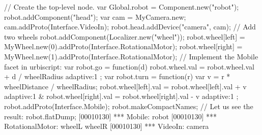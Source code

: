 \begin{urbiunchecked}
// Create the top-level node.
var Global.robot = Component.new("robot");
robot.addComponent("head");
var cam = MyCamera.new;
cam.addProto(Interface.VideoIn);
robot.head.addDevice("camera", cam);
// Add two wheels
robot.addComponent(Localizer.new("wheel"));
robot.wheel[left] = MyWheel.new(0).addProto(Interface.RotationalMotor);
robot.wheel[right] = MyWheel.new(1).addProto(Interface.RotationalMotor);
// Implement the Mobile facet in urbiscript:
var robot.go = function(d)
{
  robot.wheel.val = robot.wheel.val + d / wheelRadius adaptive:1
};
var robot.turn = function(r)
{
  var v = r * wheelDistance / wheelRadius;
  robot.wheel[left].val = robot.wheel[left].val + v adaptive:1 &
  robot.wheel[right].val = robot.wheel[right].val - v adaptive:1
};
robot.addProto(Interface.Mobile);
robot.makeCompactNames;
// Let us see the result:
robot.flatDump;
[00010130] *** Mobile: robot
[00010130] *** RotationalMotor: wheelL wheelR
[00010130] *** VideoIn: camera
\end{urbiunchecked}

\let\subsection\subsectionOrig

